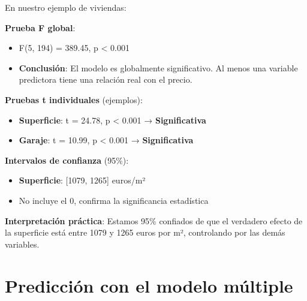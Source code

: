 \documentclass[
  letterpaper,
  DIV=11,
  numbers=noendperiod]{scrreprt}
\providecommand{\tightlist}{%
  \setlength{\itemsep}{0pt}\setlength{\parskip}{0pt}}
\begin{document}
\begin{tcolorbox}[enhanced jigsaw, breakable, toprule=.15mm, bottomtitle=1mm, coltitle=black, colbacktitle=quarto-callout-tip-color!10!white, titlerule=0mm, opacitybacktitle=0.6, bottomrule=.15mm, toptitle=1mm, title=\textcolor{quarto-callout-tip-color}{\faLightbulb}\hspace{0.5em}{Interpretación de las pruebas estadísticas}, arc=.35mm, rightrule=.15mm, opacityback=0, colframe=quarto-callout-tip-color-frame, leftrule=.75mm, left=2mm, colback=white]

En nuestro ejemplo de viviendas:

\textbf{Prueba F global}:

\begin{itemize}
\tightlist
\item
  F(5, 194) = 389.45, p \textless{} 0.001
\item
  \textbf{Conclusión}: El modelo es globalmente significativo. Al menos
  una variable predictora tiene una relación real con el precio.
\end{itemize}

\textbf{Pruebas t individuales} (ejemplos):

\begin{itemize}
\tightlist
\item
  \textbf{Superficie}: t = 24.78, p \textless{} 0.001 →
  \textbf{Significativa}
\item
  \textbf{Garaje}: t = 10.99, p \textless{} 0.001 →
  \textbf{Significativa}
\end{itemize}

\textbf{Intervalos de confianza} (95\%):

\begin{itemize}
\tightlist
\item
  \textbf{Superficie}: {[}1079, 1265{]} euros/m²
\item
  No incluye el 0, confirma la significancia estadística
\end{itemize}

\textbf{Interpretación práctica}: Estamos 95\% confiados de que el
verdadero efecto de la superficie está entre 1079 y 1265 euros por m²,
controlando por las demás variables.

\end{tcolorbox}

\section{Predicción con el modelo
múltiple}\label{predicciuxf3n-con-el-modelo-muxfaltiple}
\end{document}
